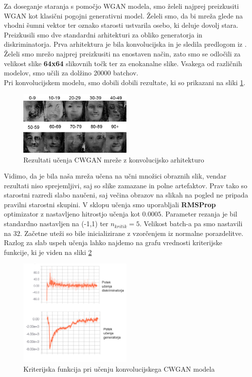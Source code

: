 \documentclass[12pt,a4paper,twoside]{article}
\theoremstyle{definition} %
\theoremstyle{plain} %
\numberwithin{equation}{section}  %
\begin{document}
Za doseganje staranja s pomočjo WGAN modela, smo želeli najprej preizkusiti WGAN kot klasični pogojni generativni model. Želeli smo, da bi mreža glede na vhodni šumni vektor ter oznako starosti ustvarila osebo, ki deluje dovolj stara. 
Preizkusili smo dve standardni arhitekturi za obliko generatorja in diskriminatorja. 
Prva arhitektura je bila konvolucijska in je sledila predlogom iz \cite{radford2015unsupervised}. 
Želeli smo mrežo najprej preizkusiti na enostaven način, zato smo se odločili za velikost slike \textbf{64x64} slikovnih točk ter za enokanalne slike. Vsakega od različnih modelov, smo učili za dolžino 20000 batchov. 
\\ Pri konvolucijskem modelu, smo dobili dobili rezultate, ki so prikazani na sliki \ref{fig:cwgan-conv-results}. 
\begin{figure}[ht]
  \centering
  \includegraphics[width=0.5\textwidth]{images/cwgan_conv_results.png}
 \caption[Rezultati učenja CWGAN mreže s konvolucijsko arhitekturo ]{Rezultati učenja CWGAN mreže z konvolucijsko arhitekturo}
  \label{fig:cwgan-conv-results}
\end{figure}
Vidimo, da  je bila naša mreža učena na  učni množici obraznih slik, vendar rezultati niso sprejemljivi, saj so slike zamazane in polne artefaktov. Prav tako so starostni razredi slabo naučeni, saj večina obrazov na slikah na pogled ne pripada pravilni starostni skupini. 
V sklopu učenja smo uporabljali \textbf{RMSProp} optimizator z nastavljeno hitrostjo učenja kot $0.0005$. Parameter rezanja je bil standardno nastavljen na (-1,1) ter $n_{kritik} =5 $. Velikost batch-a pa smo nastavili na $32$. Začetne uteži so bile inicializirane z vzorčenjem iz normalne porazdelitve. 
Razlog za slab uspeh učenja lahko najdemo na grafu vrednosti kriterijske funkcije, ki je viden na sliki \ref{fig:cwgan-loss-graph}

\begin{figure}[ht]
  \centering
  \includegraphics[width=0.5\textwidth]{images/loss_graph_wgan_conv.png}
 \caption[Kriterijska funkcija pri učenju konvolucijskega CWGAN modela ]{Kriterijska funkcija pri učenju konvolucijskega CWGAN modela}
  \label{fig:cwgan-loss-graph}
\end{figure}
\end{document}
